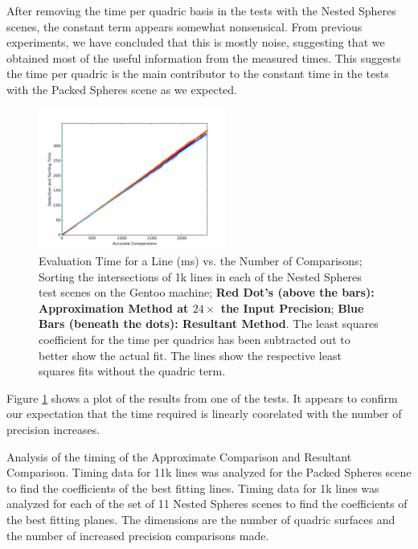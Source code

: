 \documentclass{cccg16}
\begin{document}
After removing the time per quadric basis in the tests with the Nested
Spheres scenes, the constant term appears somewhat nonsensical.  From
previous experiments, we have concluded that this is mostly noise,
suggesting that we obtained most of the useful information from the
measured times.  This suggests the time per quadric is the main
contributor to the constant time in the tests with the Packed Spheres
scene as we expected.

\begin{figure}
  \includegraphics[width=0.55\textwidth]{imgs/hardEllipsoidsSingle_gentoo_adjusted.png}
  \caption{Evaluation Time for a Line (ms) vs. the Number of
    Comparisons; Sorting the intersections of 1k lines in each of the
    Nested Spheres test scenes on the Gentoo machine; {\bf Red Dot's
      (above the bars): Approximation Method at $24\times$ the Input
      Precision}; {\bf Blue Bars (beneath the dots): Resultant
      Method}.  The least squares coefficient for the time per
    quadrics has been subtracted out to better show the actual
    fit. The lines show the respective least squares fits without the
    quadric term.}
  \label{fig:linefit}
\end{figure}

Figure \ref{fig:linefit} shows a plot of the results from one of the
tests.  It appears to confirm our expectation that the time required
is linearly coorelated with the number of precision increases.

\begin{table}
  \caption{Analysis of the timing of the Approximate Comparison and
    Resultant Comparison.  Timing data for 11k lines was analyzed for
    the Packed Spheres scene to find the coefficients of the best
    fitting lines.  Timing data for 1k lines was analyzed for each of
    the set of 11 Nested Spheres scenes to find the coefficients of
    the best fitting planes.  The dimensions are the number of quadric
    surfaces and the number of increased precision comparisons made.}
  \label{tab:times}
  \centering
  
\end{table}
\end{document}
